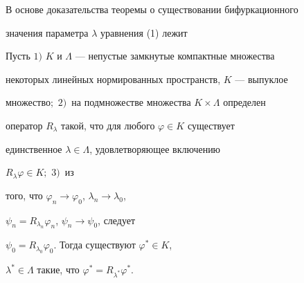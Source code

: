  


В основе доказательства теоремы о существовании бифуркационного 


значения параметра $\lambda$ уравнения (1) лежит 


 


\begin{thm} 


Пусть $1)$ $K$ и $\Lambda$ --- непустые замкнутые компактные множества 


некоторых линейных нормированных пространств, $K$ --- выпуклое 


множество$;$ $2)$~на подмножестве множества $K\times\Lambda$ определен 


оператор $R_\lambda$ такой, что для любого $\varphi\in K$ существует 


единственное $\lambda\in\Lambda$, удовлетворяющее включению


$R_\lambda\varphi\in K;$ $3)$~из 


того, что $\varphi_n\to\varphi_0$, $\lambda_n\to\lambda_0$, 


$\psi_n=R_{\lambda_n}\varphi_n$, $\psi_n\to\psi_0$, следует


$\psi_0=R_{\lambda_0}\varphi_0$. Тогда существуют $\varphi^*\in K$, 


$\lambda^*\in\Lambda$ такие, что $\varphi^*=R_{\lambda^*}\varphi^*$. 


\end{thm} 


 


